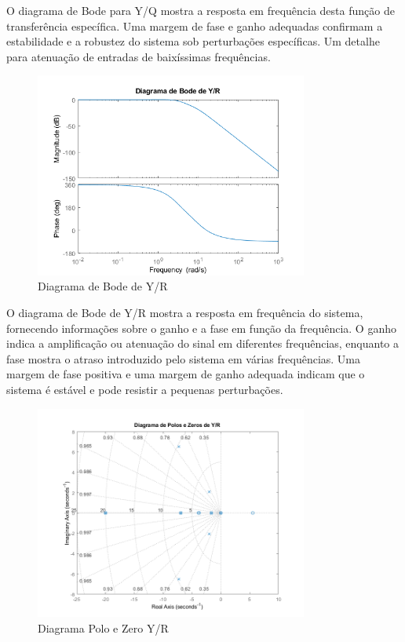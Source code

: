 \documentclass[a4paper,12pt]{article}
\begin{document}
O diagrama de Bode para Y/Q mostra a resposta em frequência desta função de transferência específica. Uma margem de fase e ganho adequadas confirmam a estabilidade e a robustez do sistema sob perturbações específicas. Um detalhe para atenuação de entradas de baixíssimas frequências.

\begin{figure}[H]
    \centering %
    \includegraphics[width=0.8\textwidth]{Imagens/1B/1BbodeYRAutoral.png} %
    \caption{Diagrama de Bode de Y/R}
\end{figure}

O diagrama de Bode de Y/R mostra a resposta em frequência do sistema, fornecendo informações sobre o ganho e a fase em função da frequência. O ganho indica a amplificação ou atenuação do sinal em diferentes frequências, enquanto a fase mostra o atraso introduzido pelo sistema em várias frequências. Uma margem de fase positiva e uma margem de ganho adequada indicam que o sistema é estável e pode resistir a pequenas perturbações.

\begin{figure}[H]
    \centering %
    \includegraphics[width=0.8\textwidth]{Imagens/1B/1BDiagramaYRpolozeroAutoral.png} %
    \caption{Diagrama Polo e Zero Y/R}
\end{figure}
\end{document}
